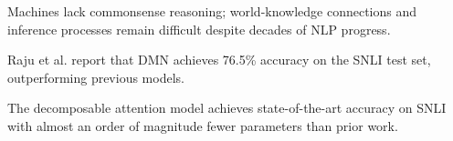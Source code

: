\documentclass[runningheads]{llncs}
\begin{document}
Machines lack commonsense reasoning; world-knowledge connections and inference processes remain difficult despite decades of NLP progress. \cite{storks2019recent}

Raju et al. report that DMN achieves 76.5\% accuracy on the SNLI test set, outperforming previous models. \cite{raju2017dynamic}

The decomposable attention model achieves state-of-the-art accuracy on SNLI with almost an order of magnitude fewer parameters than prior work. \cite{parikh2016decomposable}



\end{document}
